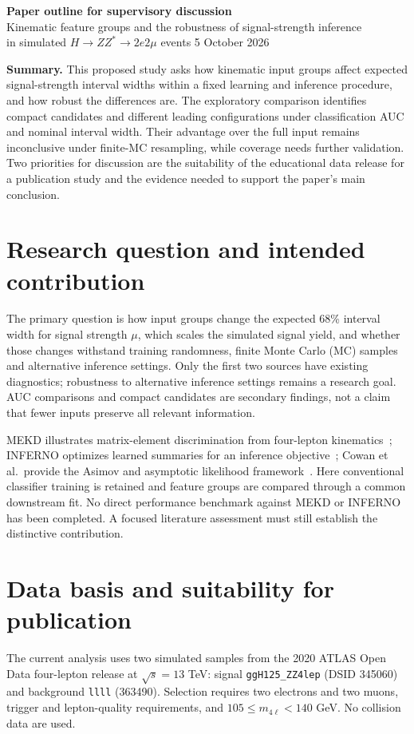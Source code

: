 \documentclass[11pt,a4paper]{article}
\newcommand{\mfl}{m_{4\ell}}
\begin{document}
\begin{center}
{\Large\bfseries Paper outline for supervisory discussion}\\[0.4em]
{\large Kinematic feature groups and the robustness of signal-strength inference}\\
in simulated $H\to ZZ^*\to2e2\mu$ events \hfill 5 October 2026
\end{center}

\textbf{Summary.} This proposed study asks how kinematic input groups affect
expected signal-strength interval widths within a fixed learning and inference
procedure, and how robust the differences are. The exploratory comparison
identifies compact candidates and different leading configurations under
classification AUC and nominal interval width. Their advantage over the full
input remains inconclusive under finite-MC resampling, while coverage needs
further validation. Two priorities for discussion are the suitability of the
educational data release for a publication study and the evidence needed to
support the paper's main conclusion.

\section{Research question and intended contribution}
The primary question is how input groups change the expected 68\% interval
width for signal strength $\mu$, which scales the simulated signal yield,
and whether those changes withstand training randomness, finite Monte Carlo
(MC) samples and alternative inference settings. Only the first two sources
have existing diagnostics; robustness to alternative inference settings remains
a research goal. AUC comparisons and compact candidates are secondary findings,
not a claim that fewer inputs preserve all relevant information.

MEKD illustrates matrix-element discrimination from four-lepton
kinematics~\cite{mekd}; INFERNO optimizes learned summaries for an inference
objective~\cite{inferno}; Cowan et al.\ provide the Asimov and asymptotic
likelihood framework~\cite{cowan}. Here conventional classifier training is
retained and feature groups are compared through a common downstream fit.
No direct performance benchmark against MEKD or INFERNO has been completed.
A focused literature assessment must still establish the distinctive contribution.

\section{Data basis and suitability for publication}
The current analysis uses two simulated samples from the 2020 ATLAS Open Data
four-lepton release at $\sqrt{s}=13$ TeV: signal
\texttt{ggH125\_ZZ4lep} (DSID 345060) and background \texttt{llll} (363490).
Selection requires two electrons and two muons, trigger and lepton-quality
requirements, and $105\leq\mfl<140$ GeV. No collision data are used.
\end{document}
